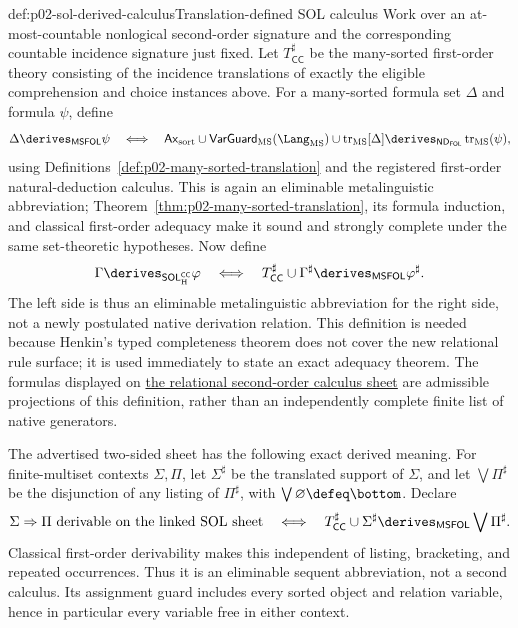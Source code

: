 \begin{hbdefinition}{def:p02-sol-derived-calculus}{Translation-defined SOL calculus}
Work over an at-most-countable nonlogical second-order signature and the
corresponding countable incidence signature just fixed.  Let
\(T_{\mathsf{CC}}^\sharp\) be the many-sorted first-order theory
consisting of the incidence translations of exactly the eligible
comprehension and choice instances above.  For a many-sorted formula set
\(\Delta\) and formula \(\psi\), define
\[
 \Delta\derives_{\mathsf{MSFOL}}\psi
 \quad\Longleftrightarrow\quad
 \mathsf{Ax}_{\mathrm{sort}}\cup
 \mathsf{VarGuard}_{\mathrm{MS}}(\Lang_{\mathrm{MS}})\cup
 \operatorname{tr}_{\mathrm{MS}}[\Delta]
 \derives_{\mathsf{ND}_{\mathsf{FOL}}}
 \operatorname{tr}_{\mathrm{MS}}(\psi),
\]
using Definitions~\ref{def:p02-many-sorted-translation} and the registered
first-order natural-deduction calculus.  This is again an eliminable
metalinguistic abbreviation; Theorem~\ref{thm:p02-many-sorted-translation},
its formula induction, and classical first-order adequacy make it sound and
strongly complete under the same set-theoretic hypotheses.  Now define
\[
 \Gamma\derives_{\mathsf{SOL}_{\mathrm H}^{\mathsf{CC}}}\varphi
 \quad\Longleftrightarrow\quad
 T_{\mathsf{CC}}^\sharp\cup\Gamma^\sharp
 \derives_{\mathsf{MSFOL}}\varphi^\sharp.
\]
The left side is thus an eliminable metalinguistic abbreviation for the right
side, not a newly postulated native derivation relation.  This definition is
needed because Henkin's typed completeness theorem does not cover the new
relational rule surface; it is used immediately to state an exact adequacy
theorem.  The formulas displayed on
\hyperref[sheet:sol]{the relational second-order calculus sheet} are admissible
projections of this definition, rather than an independently complete finite
list of native generators.

The advertised two-sided sheet has the following exact derived meaning.  For
finite-multiset contexts \(\Sigma,\Pi\), let \(\Sigma^\sharp\) be the
translated support of \(\Sigma\), and let \(\bigvee\Pi^\sharp\) be the
disjunction of any listing of \(\Pi^\sharp\), with
\(\bigvee\varnothing\defeq\bottom\).  Declare
\[
 \Sigma\Rightarrow\Pi\text{ derivable on the linked SOL sheet}
 \quad\Longleftrightarrow\quad
 T_{\mathsf{CC}}^\sharp\cup\Sigma^\sharp
 \derives_{\mathsf{MSFOL}}\bigvee\Pi^\sharp.
\]
Classical first-order derivability makes this independent of listing,
bracketing, and repeated occurrences.  Thus it is an eliminable sequent
abbreviation, not a second calculus.  Its assignment guard includes every
sorted object and relation variable, hence in particular every variable free
in either context.
\end{hbdefinition}


